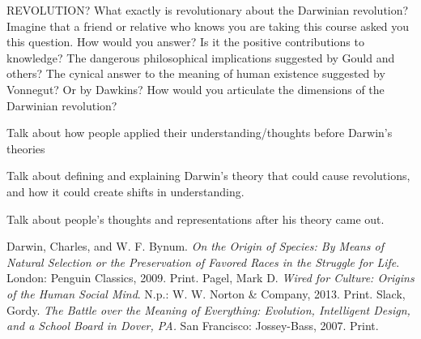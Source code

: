 \documentclass[11pt, oneside]{article}
\title{}
\author{Abhi Agarwal (abhia@nyu.edu)}
\date{}
\begin{document}
\maketitle

\par REVOLUTION? What exactly is revolutionary about the Darwinian revolution? Imagine that a friend
or relative who knows you are taking this course asked you this question. How would you answer? Is
it the positive contributions to knowledge? The dangerous philosophical implications suggested by
Gould and others? The cynical answer to the meaning of human existence suggested by Vonnegut?
Or by Dawkins? How would you articulate the dimensions of the Darwinian revolution?

\par Talk about how people applied their understanding/thoughts before Darwin's theories

\par Talk about defining and explaining Darwin's theory that could cause revolutions, and how it could create shifts in understanding.

\par Talk about people's thoughts and representations after his theory came out.

\par 

\begin{thebibliography}{9}
	Darwin, Charles, and W. F. Bynum.
	\emph{On the Origin of Species: By Means of Natural Selection or the Preservation of Favored Races in the Struggle for Life}.
	London: Penguin Classics, 2009.
	Print.
	Pagel, Mark D. 
	\emph{Wired for Culture: Origins of the Human Social Mind}. 
	N.p.: W. W. Norton \& Company, 2013. 
	Print. 
	Slack, Gordy. 
	\emph{The Battle over the Meaning of Everything: Evolution, Intelligent Design, and a School Board in Dover, PA.}
	San Francisco: Jossey-Bass, 2007. 
	Print.
\end{thebibliography}
\end{document}
